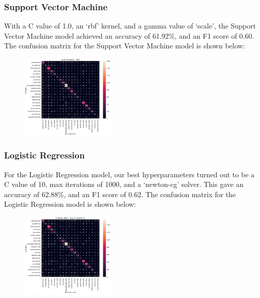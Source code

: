 \subsubsection{Support Vector Machine}
With a C value of 1.0, an `rbf' kernel, and a gamma value of `scale', the Support Vector Machine model achieved an accuracy of 61.92\%, and an F1 score of 0.60. The confusion matrix for the Support Vector Machine model is shown below:
\begin{figure}[H]
    \centering
    \includegraphics[width=0.4\textwidth]{svm_confmat.png}
\end{figure}

\subsubsection{Logistic Regression}
For the Logistic Regression model, our best hyperparameters turned out to be a C value of 10, max iterations of 1000, and a `newton-cg' solver. This gave an accuracy of 62.88\%, and an F1 score of 0.62. The confusion matrix for the Logistic Regression model is shown below:
\begin{figure}[H]
    \centering
    \includegraphics[width=0.4\textwidth]{logreg_confmat.png}
\end{figure}

